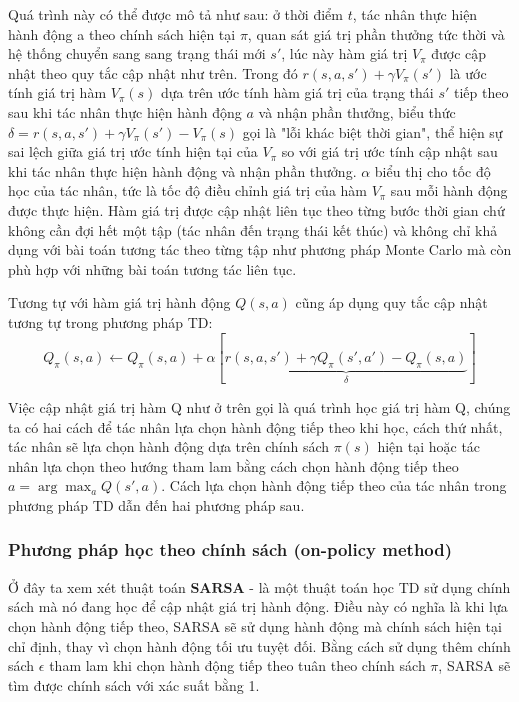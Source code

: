 \documentclass{uetgraduation}
\begin{document}
Quá trình này có thể được mô tả như sau: ở thời điểm $t$, tác nhân thực hiện hành động a theo chính sách hiện tại $\pi$, quan sát giá trị phần thưởng tức thời và hệ thống chuyển sang
sang trạng thái mới $s'$, lúc này hàm giá trị $V_\pi$ được cập nhật theo quy tắc cập nhật như trên. Trong đó $r(s, a, s') + \gamma V_\pi (s')$ là ước tính giá trị hàm $V_\pi (s)$ dựa
trên ước tính hàm giá trị của trạng thái $s'$ tiếp theo sau khi tác nhân thực hiện hành động $a$ và nhận phần thưởng, biểu thức $\delta = r(s, a, s') + \gamma V_\pi (s') - V_\pi (s)$ gọi là "lỗi khác biệt thời gian", 
thể hiện sự sai lệch giữa giá trị ước tính hiện tại của $V_\pi$ so với giá trị ước tính cập nhật sau khi tác nhân thực hiện hành động và nhận phần thưởng. $\alpha$ biểu thị cho tốc
độ học của tác nhân, tức là tốc độ điều chỉnh giá trị của hàm $V_\pi$ sau mỗi hành động được thực hiện. Hàm giá trị được cập nhật liên tục theo từng bước thời gian chứ không cần đợi
hết một tập (tác nhân đến trạng thái kết thúc) và không chỉ khả dụng với bài toán tương tác theo từng tập như phương pháp Monte Carlo mà còn phù hợp với những bài toán tương tác liên tục.

Tương tự với hàm giá trị hành động $Q(s, a)$ cũng áp dụng quy tắc cập nhật tương tự trong phương pháp TD:
\begin{equation}
    Q_\pi (s, a) \leftarrow Q_\pi (s, a) + \alpha [\underbrace{r(s, a, s') + \gamma Q_\pi (s', a') - Q_\pi (s, a)}_\delta]
\end{equation}

Việc cập nhật giá trị hàm Q như ở trên gọi là quá trình học giá trị hàm Q, chúng ta có hai cách để tác nhân lựa chọn hành động tiếp theo khi học, cách thứ nhất, tác nhân sẽ lựa chọn
hành động dựa trên chính sách $\pi (s)$ hiện tại hoặc tác nhân lựa chọn theo hướng tham lam bằng cách chọn hành động tiếp theo $a = \arg \max_{a} Q(s', a)$. Cách lựa chọn hành động
tiếp theo của tác nhân trong phương pháp TD dẫn đến hai phương pháp sau.

\subsubsection{Phương pháp học theo chính sách (on-policy method)}
Ở đây ta xem xét thuật toán $\textbf{SARSA}$ - là một thuật toán học TD sử dụng chính sách mà nó đang học để cập nhật giá trị hành động. Điều này có nghĩa là
khi lựa chọn hành động tiếp theo, SARSA sẽ sử dụng hành động mà chính sách hiện tại chỉ định, thay vì chọn hành động tối ưu tuyệt đối. Bằng cách sử dụng thêm chính sách $\epsilon$
tham lam khi chọn hành động tiếp theo tuân theo chính sách $\pi$, SARSA sẽ tìm được chính sách với xác suất bằng 1.
    
\end{document}
